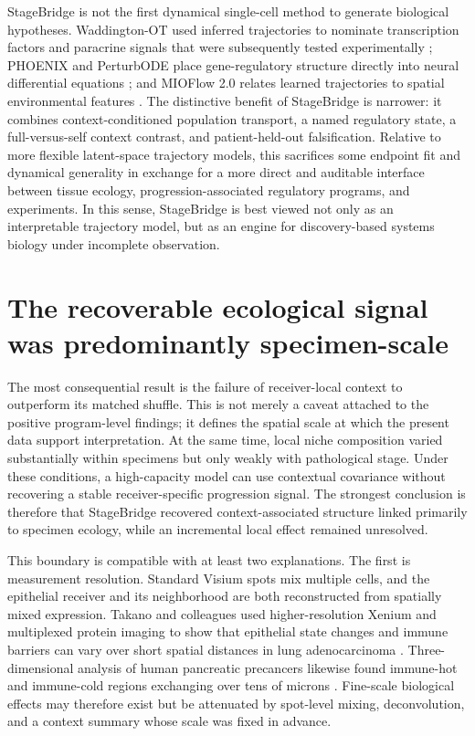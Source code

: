 StageBridge is not the first dynamical single-cell method to generate biological hypotheses. Waddington-OT used inferred trajectories to nominate transcription factors and paracrine signals that were subsequently tested experimentally \autocite{Schiebinger2019-lm}; PHOENIX and PerturbODE place gene-regulatory structure directly into neural differential equations \autocite{Hossain2024-kt,Lin2025-yl}; and MIOFlow 2.0 relates learned trajectories to spatial environmental features \autocite{Sun2026-xk}. The distinctive benefit of StageBridge is narrower: it combines context-conditioned population transport, a named regulatory state, a full-versus-self context contrast, and patient-held-out falsification. Relative to more flexible latent-space trajectory models, this sacrifices some endpoint fit and dynamical generality in exchange for a more direct and auditable interface between tissue ecology, progression-associated regulatory programs, and experiments. In this sense, StageBridge is best viewed not only as an interpretable trajectory model, but as an engine for discovery-based systems biology under incomplete observation.

\section{The recoverable ecological signal was predominantly specimen-scale}
\label{sec:scale}

The most consequential result is the failure of receiver-local context to outperform its matched shuffle. This is not merely a caveat attached to the positive program-level findings; it defines the spatial scale at which the present data support interpretation. At the same time, local niche composition varied substantially within specimens but only weakly with pathological stage. Under these conditions, a high-capacity model can use contextual covariance without recovering a stable receiver-specific progression signal. The strongest conclusion is therefore that StageBridge recovered context-associated structure linked primarily to specimen ecology, while an incremental local effect remained unresolved.

This boundary is compatible with at least two explanations. The first is measurement resolution. Standard Visium spots mix multiple cells, and the epithelial receiver and its neighborhood are both reconstructed from spatially mixed expression. Takano and colleagues used higher-resolution Xenium and multiplexed protein imaging to show that epithelial state changes and immune barriers can vary over short spatial distances in lung adenocarcinoma \autocite{Takano2024-gp}. Three-dimensional analysis of human pancreatic precancers likewise found immune-hot and immune-cold regions exchanging over tens of microns \autocite{Kiemen2026-dz}. Fine-scale biological effects may therefore exist but be attenuated by spot-level mixing, deconvolution, and a context summary whose scale was fixed in advance.

